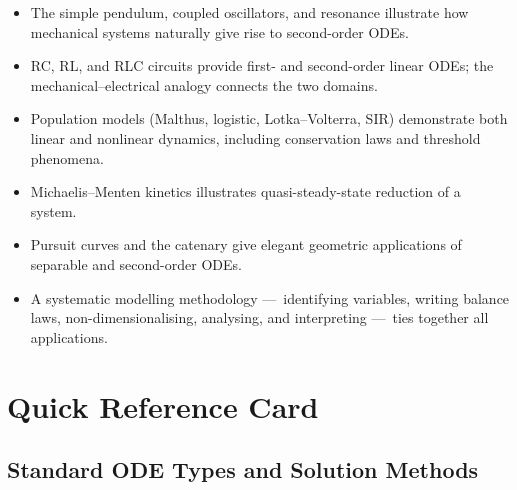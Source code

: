 \documentclass[12pt,a4paper,openany]{book}
\theoremstyle{definition}
\theoremstyle{plain}
\theoremstyle{remark}
\begin{document}
\begin{itemize}
  \item The simple pendulum, coupled oscillators, and resonance
    illustrate how mechanical systems naturally give rise to
    second-order ODEs.
  \item RC, RL, and RLC circuits provide first- and second-order
    linear ODEs; the mechanical--electrical analogy connects the two
    domains.
  \item Population models (Malthus, logistic, Lotka--Volterra, SIR)
    demonstrate both linear and nonlinear dynamics, including
    conservation laws and threshold phenomena.
  \item Michaelis--Menten kinetics illustrates quasi-steady-state
    reduction of a system.
  \item Pursuit curves and the catenary give elegant geometric
    applications of separable and second-order ODEs.
  \item A systematic modelling methodology ---~identifying variables,
    writing balance laws, non-dimensionalising, analysing, and
    interpreting ---~ties together all applications.
\end{itemize}



\chapter*{Quick Reference Card}
\label{ch:quick-reference}

\section*{Standard ODE Types and Solution Methods}

\renewcommand{\arraystretch}{1.4}
\end{document}
